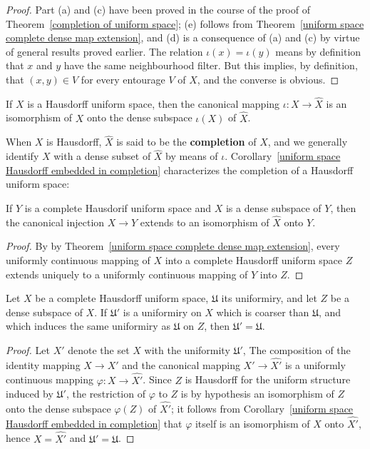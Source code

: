 \begin{proof}
Part (a) and (c) have been proved in the course of the proof of Theorem~\ref{completion of uniform space}; (e) follows from Theorem~\ref{uniform space complete dense map extension}, and (d) is a consequence of (a) and (c) by virtue of general results proved earlier. The relation $\iota(x)=\iota(y)$ means by definition that $x$ and $y$ have the same neighbourhood filter. But this implies, by definition, that $(x,y)\in V$ for every entourage $V$ of $X$, and the converse is obvious.
\end{proof}
\begin{corollary}\label{uniform space Hausdorff embedded in completion}
If $X$ is a Hausdorff uniform space, then the canonical mapping $\iota:X\to\widehat{X}$ is an isomorphism of $X$ onto the dense subspace $\iota(X)$ of $\widehat{X}$.
\end{corollary}
When $X$ is Hausdorff, $\widehat{X}$ is said to be the \textbf{completion} of $X$, and we generally identify $X$ with a dense subset of $\widehat{X}$ by means of $\iota$. Corollary~\ref{uniform space Hausdorff embedded in completion} characterizes the completion of a Hausdorff uniform space:
\begin{proposition}\label{uniform complete Hausdorff dense subspace completion}
If $Y$ is a complete Hausdorif uniform space and $X$ is a dense subspace of $Y$, then the canonical injection $X\to Y$ extends to an isomorphism of $\widehat{X}$ onto $Y$.
\end{proposition}
\begin{proof}
By by Theorem~\ref{uniform space complete dense map extension}, every uniformly continuous mapping of $X$ into a complete Hausdorff uniform space $Z$ extends uniquely to a uniformly continuous mapping of $Y$ into $Z$.
\end{proof}
\begin{proposition}\label{uniform complete Hausdorff coarser uniformity}
Let $X$ be a complete Hausdorff uniform space, $\mathfrak{U}$ its uniformiry, and let $Z$ be a dense subspace of $X$. If $\mathfrak{U}'$ is a uniformiry on $X$ which is coarser than $\mathfrak{U}$, and which induces the same uniformiry as $\mathfrak{U}$ on $Z$, then $\mathfrak{U}'=\mathfrak{U}$.
\end{proposition}
\begin{proof}
Let $X'$ denote the set $X$ with the uniformity $\mathfrak{U}'$, The composition of the identity mapping $X\to X'$ and the canonical mapping $X'\to\widehat{X'}$ is a uniformly continuous mapping $\varphi:X\to\widehat{X'}$. Since $Z$ is Hausdorff for the uniform structure induced by $\mathfrak{U}'$, the restriction of $\varphi$ to $Z$ is by hypothesis an isomorphism of $Z$ onto the dense subspace $\varphi(Z)$ of $\widehat{X'}$; it follows from Corollary~\ref{uniform space Hausdorff embedded in completion} that $\varphi$ itself is an isomorphism of $X$ onto $\widehat{X'}$, hence $X=\widehat{X'}$ and $\mathfrak{U}'=\mathfrak{U}$.
\end{proof}
